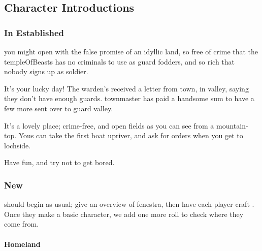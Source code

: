 \begin{multicols}{2}

\subsection{Character Introductions}

\subsubsection{In Established }
you might open with the false promise of an idyllic land, so free of crime that the \gls{templeOfBeasts} has no criminals to use as \gls{guard} \glspl{fodder}, and so rich that nobody signs up as  \gls{soldier}.

\begin{speechtext}
  It's your lucky day!
  The \gls{warden}'s received a letter from \gls{town}, in \gls{valley}, saying they don't have enough \glspl{guard}.
  \Gls{townmaster} has paid a handsome sum to have a few more sent over to guard \gls{valley}.

  It's a lovely place; crime-free, and open fields as you can see from a mountain-top.
  Yous can take the first boat upriver, and ask for orders when you get to \gls{lochside}.

  Have fun, and try not to get bored.
\end{speechtext}

\subsubsection{New }
should begin as usual; give an overview of \gls{fenestra},%
then have each player craft .%
Once they make a basic character, we add one more roll to check where they come from.

\paragraph{Homeland}


\end{multicols}
